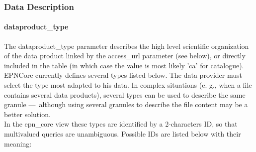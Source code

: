 \documentclass[11pt,a4paper]{ivoa}
\begin{document}
\subsubsection{Data Description}

\paragraph{dataproduct\_type}

The dataproduct\_type parameter describes the high level scientific organization of the data product linked by the access\_url parameter (see below), or directly included in the table (in which case the value is most likely 'ca' for catalogue). EPNCore currently defines several types listed below. The data provider must select the type most adapted to his data. In complex situations (e. g., when a file contains several data products), several types can be used to describe the same granule — although using several granules to describe the file content may be a better solution. \\ In the epn\_core view these types are identified by a 2-characters ID, so that multivalued queries are unambiguous. Possible IDs are listed below with their meaning:
\end{document}
